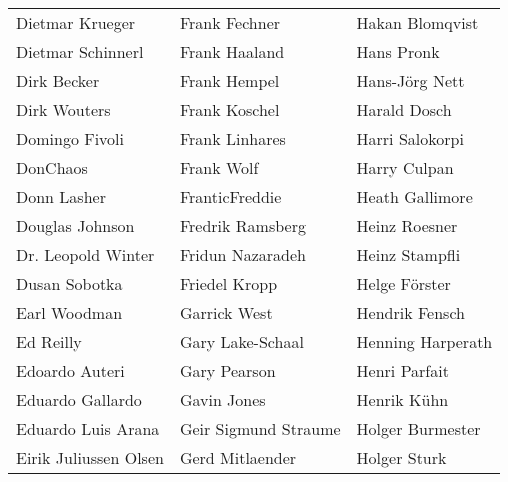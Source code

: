 \begin{tabular}{p{4.5cm}p{4.5cm}p{4.5cm}}
Dietmar Krueger & Frank Fechner & Hakan Blomqvist \\
Dietmar Schinnerl & Frank Haaland & Hans Pronk \\
Dirk Becker & Frank Hempel & Hans-Jörg Nett \\
Dirk Wouters & Frank Koschel & Harald Dosch \\
Domingo Fivoli & Frank Linhares & Harri Salokorpi \\
DonChaos & Frank Wolf & Harry Culpan \\
Donn Lasher & FranticFreddie & Heath Gallimore \\
Douglas Johnson & Fredrik Ramsberg & Heinz Roesner \\
Dr. Leopold Winter & Fridun Nazaradeh & Heinz Stampfli \\
Dusan Sobotka & Friedel Kropp & Helge Förster \\
Earl Woodman & Garrick West & Hendrik Fensch \\
Ed Reilly & Gary Lake-Schaal & Henning Harperath \\
Edoardo Auteri & Gary Pearson & Henri Parfait \\
Eduardo Gallardo & Gavin Jones & Henrik Kühn \\
Eduardo Luis Arana & Geir Sigmund Straume & Holger Burmester \\
Eirik Juliussen Olsen & Gerd Mitlaender & Holger Sturk \\
\end{tabular}
\newpage
\setlength{\tabcolsep}{1mm}
